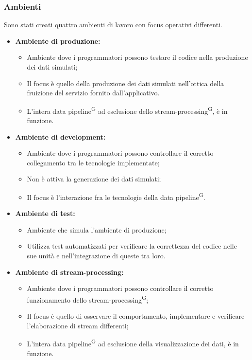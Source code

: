 \documentclass[8pt]{article}
\newcommand{\glossterm}[1]{#1\textsuperscript{G}} %
\begin{document}
\subsubsection{Ambienti}
Sono stati creati quattro ambienti di lavoro con focus operativi differenti.
\begin{itemize}
    \item \textbf{Ambiente di produzione:}
    \begin{itemize}
        \item Ambiente dove i programmatori possono testare il codice nella produzione dei dati simulati;
        \item Il focus è quello della produzione dei dati simulati nell'ottica della fruizione del servizio fornito dall'applicativo.
        \item L'intera \glossterm{data pipeline} ad esclusione dello \glossterm{stream-processing}, è in funzione.
    \end{itemize}
    \item \textbf{Ambiente di development:}
    \begin{itemize}
        \item Ambiente dove i programmatori possono controllare il corretto collegamento tra le tecnologie implementate;
        \item Non è attiva la generazione dei dati simulati;
        \item Il focus è l'interazione fra le tecnologie della \glossterm{data pipeline}.
    \end{itemize}
    \item \textbf{Ambiente di test:}
    \begin{itemize}
        \item Ambiente che simula l'ambiente di produzione;
        \item Utilizza test automatizzati per verificare la correttezza del codice nelle sue unità e nell'integrazione di queste tra loro.
    \end{itemize}
     \item \textbf{Ambiente di stream-processing:}
    \begin{itemize}
        \item Ambiente dove i programmatori possono controllare il corretto funzionamento dello \glossterm{stream-processing};
        \item Il focus è quello di osservare il comportamento, implementare e verificare l'elaborazione di stream differenti;
        \item L'intera \glossterm{data pipeline} ad esclusione della visualizzazione dei dati, è in funzione.
    \end{itemize}
\end{itemize}
\end{document}
